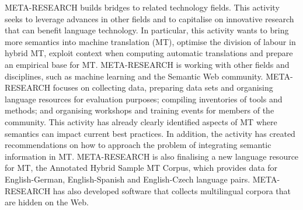 \begin{multicols}{2}
META-RESEARCH builds bridges to related technology fields. This activity seeks to leverage advances in other fields and to capitalise on innovative research that can benefit language technology. In particular, this activity wants to bring more semantics into machine translation (MT), optimise the division of labour in hybrid MT, exploit context when computing automatic translations and prepare an empirical base for MT. META-RESEARCH is working with other fields and disciplines, such as machine learning and the Semantic Web community. META-RESEARCH focuses on collecting data, preparing data sets and organising language resources for evaluation purposes; compiling inventories of tools and methods; and organising workshops and training events for members of the community. This activity has already clearly identified aspects of MT where semantics can impact current best practices. In addition, the activity has created recommendations on how to approach the problem of integrating 
 semantic information in MT. META-RESEARCH is also finalising a new language resource for MT, the Annotated Hybrid Sample MT Corpus, which provides data for English-German, English-Spanish and English-Czech language pairs. META-RESEARCH has also developed software that collects multilingual corpora that are hidden on the Web.
\end{multicols}

\cleardoublepage

\appendix
{}



  
\cleardoublepage

\label{metanetmembers}

